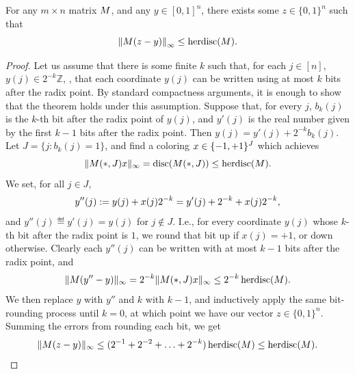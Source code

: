 \begin{theorem}\label{thm:ch1-transference}
  For any $m\times n$ matrix $M$,
  and any $y \in [0,1]^n$,
  there exists some $z \in \{0,1\}^n$ such that 
  \[
    \left\|M (z-y)\right\|_\infty
    \le
    \operatorname{herdisc}(M).
  \]
\end{theorem}
\begin{proof}
  Let us assume that there is some finite $k$ such that, for each $j \in [n]$, $y(j) \in 2^{-k} \mathbb{Z}$, \ie, that each coordinate $y(j)$
  can be written using at most $k$ bits after the radix point. By standard compactness arguments, it is
  enough to show that the theorem holds under this assumption. Suppose that, for every $j$,
  $b_k(j)$ is the $k$-th bit after the radix point of $y(j)$, and $y'(j)$ is the real number given by the first $k-1$ bits after the radix point. Then $y(j) = y'(j) + 2^{-k} b_k(j)$. Let $J = \{j: b_k(j) = 1\}$, and find a
  coloring $x\in \{-1,+1\}^J$ which achieves
  \[
  \|M(*,J) x\|_\infty = \operatorname{disc}(M(*,J)) \le \operatorname{herdisc}(M).
  \]
  We set, for all $j \in J$,
  \[
    y''(j) :=  y(j) + x(j)2^{-k} = y'(j) + 2^{-k} + x(j)2^{-k},
  \]
  and $y''(j) \eqdef y'(j) = y(j)$ for $j \not \in J$. I.e., for every coordinate $y(j)$ whose $k$-th bit after the radix point is $1$, we round that bit up if $x(j) = +1$, or down otherwise.
  Clearly each 
  \(
  y''(j)
  \)
  can be written with at most $k-1$ bits after the radix point,
  and
  \[
  \|M (y''-y)\|_\infty = 2^{-k}\|M(*,J)x\|_\infty\le 2^{-k}\operatorname{herdisc}(M).
  \]
  We then replace $y$ with $y''$ and $k$ with $k-1$, and inductively apply the same bit-rounding process until $k = 0$, at which point we have our vector $z \in \{0,1\}^n$. Summing the errors from rounding each bit, we get 
  \[
  \|M (z-y)\|_\infty \le (2^{-1} + 2^{-2} + \ldots + 2^{-k})\operatorname{herdisc}(M) \le \operatorname{herdisc}(M). \qedhere
  \]
\end{proof}

